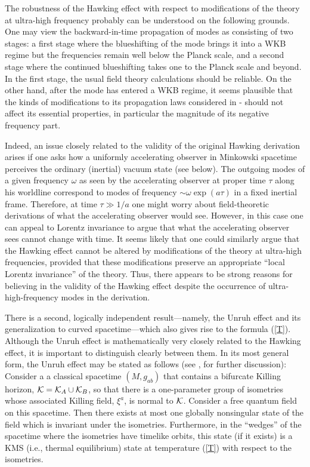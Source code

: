 The robustness of the Hawking effect with respect to modifications of
the theory at ultra-high frequency probably can be understood on the
following grounds. One may view the backward-in-time propagation of
modes as consisting of two stages: a first stage where the
blueshifting of the mode brings it into a WKB regime but the
frequencies remain well below the Planck scale, and a second stage
where the continued blueshifting takes one to the Planck scale and
beyond. In the first stage, the usual field theory calculations should
be reliable. On the other hand, after the mode has entered a WKB
regime, it seems plausible that the kinds of modifications to its
propagation laws considered in \cite{u3}-\cite{jm} should not affect
its essential properties, in particular the magnitude of its negative
frequency part.

Indeed, an issue closely related to the validity of the original
Hawking derivation arises if one asks how a uniformly accelerating
observer in Minkowski spacetime perceives the ordinary (inertial)
vacuum state (see below). The outgoing modes of a given frequency
$\omega$ as seen by the accelerating observer at proper time $\tau$
along his worldline correspond to modes of frequency $\sim \omega
\exp(a \tau)$ in a fixed inertial frame. Therefore, at time $\tau \gg
1/a$ one might worry about field-theoretic derivations of what the
accelerating observer would see. However, in this case one can appeal
to Lorentz invariance to argue that what the accelerating observer
sees cannot change with time. It seems likely that one could similarly
argue that the Hawking effect cannot be altered by modifications of
the theory at ultra-high frequencies, provided that these
modifications preserve an appropriate ``local Lorentz invariance'' of
the theory. Thus, there appears to be strong reasons for believing in
the validity of the Hawking effect despite the occurrence of
ultra-high-frequency modes in the derivation.

There is a second, logically independent result---namely, the Unruh
effect \cite{u1} and its generalization to curved spacetime---which
also gives rise to the formula (\ref{T}). Although the Unruh effect is
mathematically very closely related to the Hawking effect, it is
important to distinguish clearly between them.  In its most general
form, the Unruh effect may be stated as follows (see \cite{kw},
\cite{w4} for further discussion): Consider a a classical spacetime
$(M, g_{ab})$ that contains a bifurcate Killing horizon, ${\cal K} =
{\cal K}_A \cup {\cal K}_B$, so that there is a one-parameter group of
isometries whose associated Killing field, $\xi^a$, is normal to
${\cal K}$. Consider a free quantum field on this spacetime. Then
there exists at most one globally nonsingular state of the field which
is invariant under the isometries. Furthermore, in the ``wedges'' of
the spacetime where the isometries have timelike orbits, this state
(if it exists) is a KMS (i.e., thermal equilibrium) state at
temperature (\ref{T}) with respect to the isometries.


